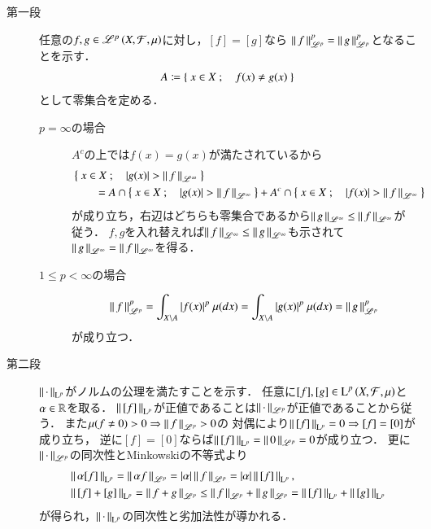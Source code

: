 \begin{prf}\mbox{}
	\begin{description}
		\item[第一段]
			任意の$f,g \in \mathscr{L}^{p} \left(X,\mathcal{F},\mu\right)$に対し，$[f] = [g]$なら
			$\left\|\, f\, \right\|_{\mathscr{L}^p}^p = \left\|\, g\, \right\|_{\mathscr{L}^p}^p$となることを示す．
			\begin{align}
				A \coloneqq \left\{\ x \in X\ ;\quad f(x) \neq g(x)\ \right\}
			\end{align}
			として零集合を定める．
			\begin{description}
				\item[$p = \infty$の場合]
					$A^c$の上では$f(x)=g(x)$が満たされているから
					\begin{align}
						&\left\{\ x \in X\ ;\quad |g(x)| > \left\|\, f\, \right\|_{\mathscr{L}^\infty}\ \right\} \\
						&\qquad = A \cap \left\{\ x \in X\ ;\quad |g(x)| > \left\|\, f\, \right\|_{\mathscr{L}^\infty}\ \right\} + A^c \cap \left\{\ x \in X\ ;\quad |f(x)| > \left\|\, f\, \right\|_{\mathscr{L}^\infty}\ \right\}
					\end{align}
					が成り立ち，右辺はどちらも零集合であるから$\left\|\, g\, \right\|_{\mathscr{L}^\infty} \leq \left\|\, f\, \right\|_{\mathscr{L}^\infty}$が従う．
					$f,g$を入れ替えれば$\left\|\, f\, \right\|_{\mathscr{L}^\infty} \leq \left\|\, g\, \right\|_{\mathscr{L}^\infty}$も示されて
					$\left\|\, g\, \right\|_{\mathscr{L}^\infty} = \left\|\, f\, \right\|_{\mathscr{L}^\infty}$を得る．
					
				\item[$1 \leq p < \infty$の場合]
					\begin{align}
						\left\|\, f\, \right\|_{\mathscr{L}^p}^p = \int_{X \backslash A} |f(x)|^p\ \mu(dx) 
						= \int_{X \backslash A} |g(x)|^p\ \mu(dx) = \left\|\, g\, \right\|_{\mathscr{L}^p}^p
					\end{align}
					が成り立つ．
			\end{description}
		
		\item[第二段]
			$\left\|\, \cdot\, \right\|_{\mathrm{L}^p}$がノルムの公理を満たすことを示す．
			任意に$[f],[g] \in \operatorname{L}^{p} \left(X,\mathcal{F},\mu\right)$と$\alpha \in \mathbb{R}$を取る．
			$\left\|\, [f]\, \right\|_{\mathrm{L}^p}$が正値であることは$\left\|\, \cdot\, \right\|_{\mathscr{L}^p}$が正値であることから従う．
			また$\mu(f \neq 0) > 0 \Rightarrow \left\|\, f\, \right\|_{\mathscr{L}^p} > 0$の
			対偶により$\left\|\, [f]\, \right\|_{\mathrm{L}^p} = 0 \Rightarrow [f] = [0]$が成り立ち，
			逆に$[f] = [0]$ならば$\left\|\, [f]\, \right\|_{\mathrm{L}^p} = \left\|\, 0\, \right\|_{\mathscr{L}^p} = 0$が成り立つ．
			更に$\left\|\, \cdot\, \right\|_{\mathscr{L}^p}$の同次性とMinkowskiの不等式より
			\begin{align}
				&\left\|\, \alpha[f]\, \right\|_{\mathrm{L}^p} = \left\|\, \alpha f\, \right\|_{\mathscr{L}^p} = |\alpha|\left\|\, f\, \right\|_{\mathscr{L}^p} = |\alpha|\left\|\, [f]\, \right\|_{\mathrm{L}^p}, \\
				&\left\|\, [f] + [g]\, \right\|_{\mathrm{L}^p} = \left\|\, f + g\, \right\|_{\mathscr{L}^p} \leq \left\|\, f\, \right\|_{\mathscr{L}^p} + \left\|\, g\, \right\|_{\mathscr{L}^p} = \left\|\, [f]\, \right\|_{\mathrm{L}^p} + \left\|\, [g]\, \right\|_{\mathrm{L}^p}
			\end{align}
			が得られ，$\left\|\, \cdot\, \right\|_{\mathrm{L}^p}$の同次性と劣加法性が導かれる．
			\QED
	\end{description}
\end{prf}

